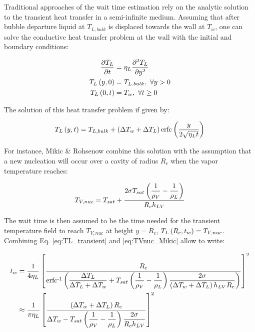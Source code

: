 Traditional approaches of the wait time estimation rely on the analytic solution to the transient heat transfer in a semi-infinite medium. Assuming that after bubble departure liquid at $T_{L,bulk}$ is displaced towards the wall at $T_{w}$, one can solve the conductive heat transfer problem at the wall with the initial and boundary conditions:

\begin{align}
\frac{\partial T_{L}}{\partial t} &= \eta_{L} \frac{\partial^{2} T_{L}}{\partial y^{2}}\\
T_{L}\left( y,0 \right) &= T_{L,bulk},\ \forall y >0\\
T_{L}\left( 0,t \right) &= T_{w},\ \forall t \geq 0
\end{align}


The solution of this heat transfer problem if given by:


\begin{equation}
T_{L}\left( y,t \right) = T_{L,bulk} + \left( \Delta T_{w} + \Delta T_{L} \right)\mathrm{erfc}\left( \frac{y}{2\sqrt{\eta_{L}t}} \right)
\label{eq:TL_transient}
\end{equation}

For instance, Mikic \& Rohsenow \cite{mikic_bubble_1970} combine this solution with the assumption that a new nucleation will occur over a cavity of radius $R_{c}$ when the vapor temperature reaches:

\begin{equation}
T_{V,nuc} = T_{sat} + \frac{2\sigma T_{sat} \left( \dfrac{1}{\rho_{V}} - \dfrac{1}{\rho_{L}}  \right)}{R_{c}h_{LV}}
\label{eq:TVnuc_Mikic} 
\end{equation} 

The wait time is then assumed to be the time needed for the transient temperature field to reach $T_{V,nuc}$ at height $y=R_{c}$, \ie $T_{L}\left( R_{c},t_{w} \right)=T_{V,nuc}$. Combining Eq. \ref{eq:TL_transient} and \ref{eq:TVnuc_Mikic} allow to write:

\begin{align}
t_{w} &= \frac{1}{4\eta_{L}} \crocht{ \frac{R_{c}}{\erfcrec{ \dfrac{\Delta T_{L}}{\Delta T_{L} + \Delta T_{w}} + T_{sat} \parth{\dfrac{1}{\rho_{V}} - \dfrac{1}{\rho_{L}}}\dfrac{2\sigma }{ \parth{\Delta T_{w} + \Delta T_{L}}h_{LV}R_{c} } } } }^{2}\\
%
& \approx \frac{1}{\pi \eta_{L}}\crocht{\frac{ \parth{\Delta T_{w} + \Delta T_{L}}R_{c} }{\Delta T_{w} - T_{sat} \parth{\dfrac{1}{\rho_{V}} - \dfrac{1}{\rho_{L}}}\dfrac{2\sigma  }{R_{c} h_{LV}} } }^{2}
\label{eq:twait_mikic}
\end{align}

